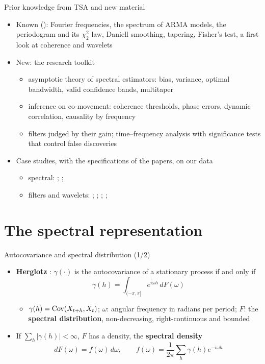 \begin{frame}{Prior knowledge from TSA and new material}
\itemsize{\small}
\begin{itemize}
    \item Known (): Fourier frequencies, the spectrum of ARMA models, the periodogram and its $\chi^2_2$ law, Daniell smoothing, tapering, Fisher's test, a first look at coherence and wavelets
    \item New: the research toolkit
    \begin{itemize}
        \item asymptotic theory of spectral estimators: bias, variance, optimal bandwidth, valid confidence bands, multitaper
        \item inference on co-movement: coherence thresholds, phase errors, dynamic correlation, causality by frequency
        \item filters judged by their gain; time--frequency analysis with significance tests that control false discoveries
    \end{itemize}
    \item Case studies, with the specifications of the papers, on our data
    \begin{itemize}
        \item spectral: ; ; 
        \item filters and wavelets: ; ; ; ; 
    \end{itemize}
\end{itemize}
\end{frame}


\section{The spectral representation}

\begin{frame}{Autocovariance and spectral distribution (1/2)}
\itemsize{\small}
\begin{itemize}
    \item \textbf{Herglotz} : $\gamma(\cdot)$ is the autocovariance of a stationary process if and only if
    \[ \gamma(h) = \int_{(-\pi, \pi]} e^{i\omega h}\,dF(\omega) \]
    \begin{itemize}
        \item $\gamma(h) = \text{Cov}(X_{t+h}, X_t)$; $\omega$: angular frequency in radians per period; $F$: the \textbf{spectral distribution}, non-decreasing, right-continuous and bounded
    \end{itemize}
    \item If $\sum_h|\gamma(h)| < \infty$, $F$ has a density, the \textbf{spectral density}
    \[ dF(\omega) = f(\omega)\,d\omega, \qquad f(\omega) = \frac{1}{2\pi}\sum_h\gamma(h)e^{-i\omega h} \]
\end{itemize}
\end{frame}

